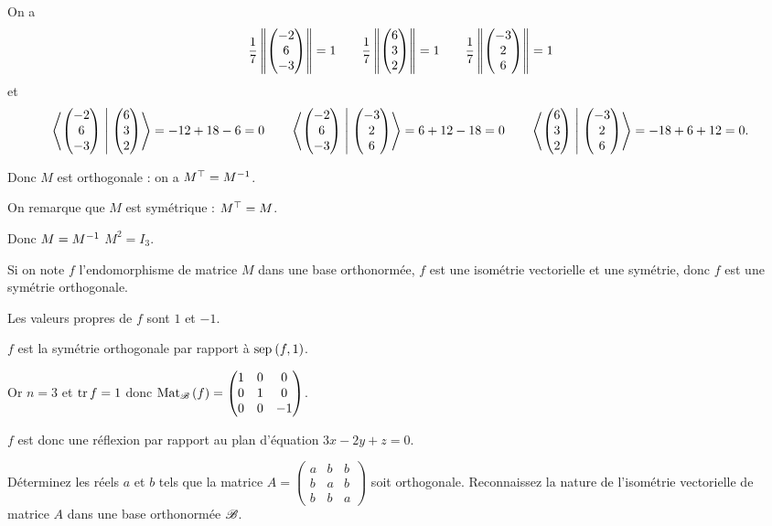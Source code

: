 \begin{corr}
On a \[\dfrac{1}{7}\norme{\tcoords{-2}{6}{-3}}=1\qquad\dfrac{1}{7}\norme{\tcoords{6}{3}{2}}=1\qquad\dfrac{1}{7}\norme{\tcoords{-3}{2}{6}}=1\] et \[\ps{\tcoords{-2}{6}{-3}}{\tcoords{6}{3}{2}}=-12+18-6=0\qquad\ps{\tcoords{-2}{6}{-3}}{\tcoords{-3}{2}{6}}=6+12-18=0\qquad\ps{\tcoords{6}{3}{2}}{\tcoords{-3}{2}{6}}=-18+6+12=0.\]

Donc \(M\) est orthogonale : on a \(M^{\top}=M^{-1}\).

On remarque que \(M\) est symétrique : \(M^{\top}=M\).

Donc \(M=M^{-1}\) \ie \(M^2=I_3\).

Si on note \(f\) l'endomorphisme de matrice \(M\) dans une base orthonormée, \(f\) est une isométrie vectorielle et une symétrie, donc \(f\) est une symétrie orthogonale.

Les valeurs propres de \(f\) sont \(1\) et \(-1\).

\(f\) est la symétrie orthogonale par rapport à \(\sep{f}{1}\).

Or \(n=3\) et \(\operatorname{tr} f=1\) donc \(\Mat{f}=\begin{pmatrix}
1 & 0 & 0 \\
0 & 1 & 0 \\
0 & 0 & -1
\end{pmatrix}\).

\(f\) est donc une réflexion par rapport au plan d'équation \(3x-2y+z=0\).
\end{corr}

\begin{exo}
Déterminez les réels \(a\) et \(b\) tels que la matrice \(A=\begin{pmatrix}
a & b & b \\
b & a & b \\
b & b & a
\end{pmatrix}\) soit orthogonale. Reconnaissez la nature de l'isométrie vectorielle de matrice \(A\) dans une base orthonormée \(\mathscr{B}\).
\end{exo}

